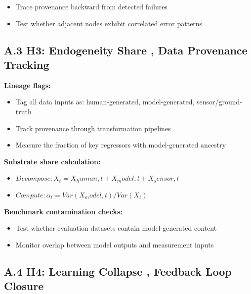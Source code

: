 \documentclass[11pt,a4paper]{article}
\providecommand{\tightlist}{\setlength{\itemsep}{0pt}\setlength{\parskip}{0pt}}
\begin{document}
\begin{itemize}
\tightlist
\item
  Trace provenance backward from detected failures
\item
  Test whether adjacent nodes exhibit correlated error patterns
\end{itemize}

\hypertarget{a.3-h3-endogeneity-share-data-provenance-tracking}{%
\subsection{A.3 H3: Endogeneity Share ,  Data Provenance Tracking}\label{a.3-h3-endogeneity-share-data-provenance-tracking}}

\textbf{Lineage flags:}

\begin{itemize}
\tightlist
\item
  Tag all data inputs as: human-generated, model-generated, sensor/ground-truth
\item
  Track provenance through transformation pipelines
\item
  Measure the fraction of key regressors with model-generated ancestry
\end{itemize}

\textbf{Substrate share calculation:}

\begin{itemize}
\tightlist
\item
$Decompose: X_t = X_human,t + X_model,t + X_sensor,t$
\item
$Compute: \alpha_t = Var(X_model,t) / Var(X_t)$
\end{itemize}

\textbf{Benchmark contamination checks:}

\begin{itemize}
\tightlist
\item
  Test whether evaluation datasets contain model-generated content
\item
  Monitor overlap between model outputs and measurement inputs
\end{itemize}

\hypertarget{a.4-h4-learning-collapse-feedback-loop-closure}{%
\subsection{A.4 H4: Learning Collapse ,  Feedback Loop Closure}\label{a.4-h4-learning-collapse-feedback-loop-closure}}
\end{document}
